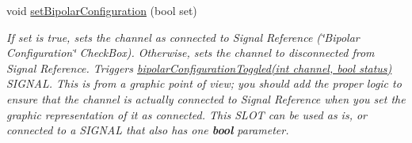 \begin{DoxyCompactItemize}
void \hyperlink{classChannelLayout_a84a2f0c9aa038d4863486b975868bed3}{set\+Bipolar\+Configuration} (bool set)
\begin{DoxyCompactList}\small\item\em If {\itshape set} is true, sets the channel as connected to Signal Reference (\char`\"{}\+Bipolar Configuration\char`\"{} Check\+Box). Otherwise, sets the channel to disconnected from Signal Reference. Triggers \hyperlink{classChannelLayout_a3e4ce867e174d9ec8533f17b43247c0f}{bipolar\+Configuration\+Toggled(int channel, bool status)} S\+I\+G\+N\+A\+L. This is from a graphic point of view; you should add the proper logic to ensure that the channel is actually connected to Signal Reference when you set the graphic representation of it as connected. This S\+L\+O\+T can be used as is, or connected to a S\+I\+G\+N\+A\+L that also has one {\bfseries bool} parameter. \end{DoxyCompactList}\end{DoxyCompactItemize}
